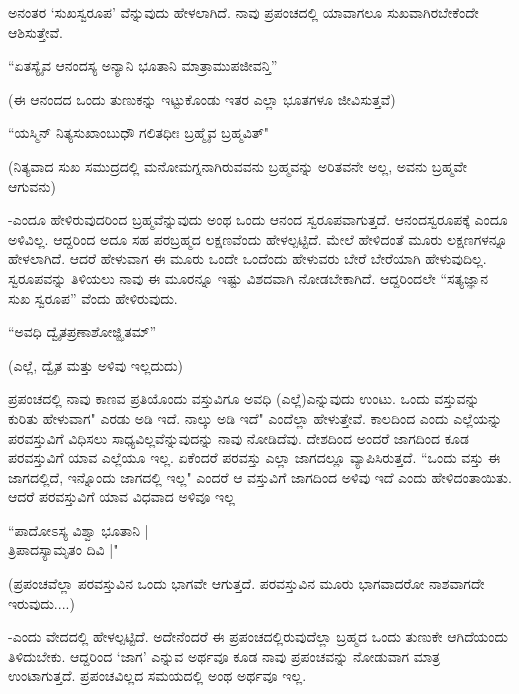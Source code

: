 ಅನಂತರ `ಸುಖಸ್ವರೂಪ' ವೆನ್ನುವುದು  ಹೇಳಲಾಗಿದೆ. ನಾವು ಪ್ರಪಂಚದಲ್ಲಿ ಯಾವಾಗಲೂ  ಸುಖವಾಗಿರಬೇಕೆಂದೇ ಆಶಿಸುತ್ತೇವೆ.

\begin{shloka}
``ಏತಸ್ಯೈವ ಆನಂದಸ್ಯ ಅನ್ಯಾನಿ ಭೂತಾನಿ ಮಾತ್ರಾಮುಪಜೀವನ್ತಿ''
\end{shloka}

(ಈ ಆನಂದದ ಒಂದು ತುಣುಕನ್ನು ಇಟ್ಟುಕೊಂಡು ಇತರ ಎಲ್ಲಾ ಭೂತಗಳೂ ಜೀವಿಸುತ್ತವೆ)

\begin{shloka}
``ಯಸ್ಮಿನ್  ನಿತ್ಯಸುಖಾಂಬುಧೌ ಗಲಿತಧೀಃ ಬ್ರಹ್ಮೈವ ಬ್ರಹ್ಮವಿತ್"
\end{shloka}

(ನಿತ್ಯವಾದ ಸುಖ ಸಮುದ್ರದಲ್ಲಿ ಮನೋಮಗ್ನನಾಗಿರುವವನು ಬ್ರಹ್ಮವನ್ನು ಅರಿತವನೇ ಅಲ್ಲ, ಅವನು ಬ್ರಹ್ಮವೇ ಆಗುವನು)


-ಎಂದೂ ಹೇಳಿರುವುದರಿಂದ ಬ್ರಹ್ಮವೆನ್ನುವುದು ಅಂಥ ಒಂದು ಆನಂದ ಸ್ವರೂಪವಾಗುತ್ತದೆ. ಆನಂದಸ್ವರೂಪಕ್ಕೆ ಎಂದೂ ಅಳಿವಿಲ್ಲ. ಆದ್ದರಿಂದ ಅದೂ ಸಹ ಪರಬ್ರಹ್ಮದ ಲಕ್ಷಣವೆಂದು ಹೇಳಲ್ಪಟ್ಟಿದೆ. ಮೇಲೆ ಹೇಳಿದಂತೆ ಮೂರು ಲಕ್ಷಣಗಳನ್ನೂ ಹೇಳಲಾಗಿದೆ. ಆದರೆ ಹೇಳುವಾಗ ಈ ಮೂರು ಒಂದೇ ಒಂದೆಂದು ಹೇಳುವರು ಬೇರೆ ಬೇರೆಯಾಗಿ ಹೇಳುವುದಿಲ್ಲ. ಸ್ವರೂಪವನ್ನು ತಿಳಿಯಲು ನಾವು ಈ ಮೂರನ್ನೂ ಇಷ್ಟು ವಿಶದವಾಗಿ ನೋಡಬೇಕಾಗಿದೆ. ಆದ್ದರಿಂದಲೇ ``ಸತ್ಯಜ್ಞಾನ ಸುಖ ಸ್ವರೂಪ'' ವೆಂದು ಹೇಳಿರುವುದು. 

\begin{shloka}
``ಅವಧಿ ದ್ವೈತಪ್ರಣಾಶೋಜ್ಝಿತಮ್''
\end{shloka}

(ಎಲ್ಲೆ, ದ್ವೈತ ಮತ್ತು ಅಳಿವು ಇಲ್ಲದುದು)

ಪ್ರಪಂಚದಲ್ಲಿ ನಾವು ಕಾಣವ ಪ್ರತಿಯೊಂದು ವಸ್ತುವಿಗೂ ಅವಧಿ (ಎಲ್ಲೆ)ಎನ್ನುವುದು ಉಂಟು. ಒಂದು ವಸ್ತುವನ್ನು ಕುರಿತು ಹೇಳುವಾಗ" ಎರಡು ಅಡಿ ಇದೆ. ನಾಲ್ಕು ಅಡಿ ಇದೆ" ಎಂದೆಲ್ಲಾ ಹೇಳುತ್ತೇವೆ. ಕಾಲದಿಂದ ಎಂದು ಎಲ್ಲೆಯನ್ನು ಪರವಸ್ತುವಿಗೆ ವಿಧಿಸಲು ಸಾಧ್ಯವಿಲ್ಲವೆನ್ನುವುದನ್ನು  ನಾವು ನೋಡಿದೆವು.  ದೇಶದಿಂದ ಅಂದರೆ ಜಾಗದಿಂದ ಕೂಡ ಪರವಸ್ತುವಿಗೆ ಯಾವ ಎಲ್ಲೆಯೂ ಇಲ್ಲ. ಏಕೆಂದರೆ ಪರವಸ್ತು ಎಲ್ಲಾ ಜಾಗದಲ್ಲೂ ವ್ಯಾಪಿಸಿರುತ್ತದೆ. ``ಒಂದು ವಸ್ತು ಈ ಜಾಗದಲ್ಲಿದೆ, ಇನ್ನೊಂದು ಜಾಗದಲ್ಲಿ ಇಲ್ಲ" ಎಂದರೆ ಆ ವಸ್ತುವಿಗೆ ಜಾಗದಿಂದ ಅಳಿವು ಇದೆ ಎಂದು ಹೇಳಿದಂತಾಯಿತು. ಆದರೆ ಪರವಸ್ತುವಿಗೆ ಯಾವ  ವಿಧವಾದ ಅಳಿವೂ ಇಲ್ಲ 

\begin{shloka}
``ಪಾದೋಽಸ್ಯ ವಿಶ್ವಾ  ಭೂತಾನಿ |\\
ತ್ರಿಪಾದಸ್ಯಾಮೃತಂ ದಿವಿ |"
\end{shloka}
 
 (ಪ್ರಪಂಚವೆಲ್ಲಾ ಪರವಸ್ತುವಿನ ಒಂದು ಭಾಗವೇ ಆಗುತ್ತದೆ. ಪರವಸ್ತುವಿನ ಮೂರು ಭಾಗವಾದರೋ ನಾಶವಾಗದೇ ಇರುವುದು....)
 
 
 -ಎಂದು ವೇದದಲ್ಲಿ ಹೇಳಲ್ಪಟ್ಟಿದೆ. ಅದೇನೆಂದರೆ ಈ ಪ್ರಪಂಚದಲ್ಲಿರುವುದೆಲ್ಲಾ ಬ್ರಹ್ಮದ ಒಂದು ತುಣುಕೇ ಆಗಿದೆಯಂದು ತಿಳಿದುಬೇಕು. ಆದ್ದರಿಂದ `ಜಾಗ' ಎನ್ನುವ ಅರ್ಥವೂ ಕೂಡ ನಾವು ಪ್ರಪಂಚವನ್ನು ನೋಡುವಾಗ ಮಾತ್ರ ಉಂಟಾಗುತ್ತದೆ.  ಪ್ರಪಂಚವಿಲ್ಲದ ಸಮಯದಲ್ಲಿ  ಅಂಥ ಅರ್ಥವೂ ಇಲ್ಲ.
 
